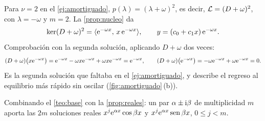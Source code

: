 \begin{ejemplo}\label{ej:critico}
Para $\nu=2$ en el \cref{ej:amortiguado}, $p(\lambda)=(\lambda+\omega)^{2}$, es
decir, $\mathcal{L}=(D+\omega)^{2}$, con $\lambda=-\omega$ y $m=2$. La
\cref{prop:nucleo} da
\begin{equation}\label{eq:critico}
  \operatorname{ker}(D+\omega)^{2}=\langle \mathrm{e}^{-\omega x},\,x\,\mathrm{e}^{-\omega x}\rangle,
  \qquad y=(c_0+c_1x)\,\mathrm{e}^{-\omega x}.
\end{equation}
Comprobación con la segunda solución, aplicando $D+\omega$ dos veces:
\[
  (D+\omega)\bigl(x\mathrm{e}^{-\omega x}\bigr)=\mathrm{e}^{-\omega x}-\omega x\mathrm{e}^{-\omega x}+\omega x\mathrm{e}^{-\omega x}=\mathrm{e}^{-\omega x},
  \qquad
  (D+\omega)\bigl(\mathrm{e}^{-\omega x}\bigr)=-\omega\mathrm{e}^{-\omega x}+\omega\mathrm{e}^{-\omega x}=0 .
\]
Es la segunda solución que faltaba en el \cref{ej:amortiguado}, y describe el
regreso al equilibrio más rápido sin oscilar (\cref{fig:amortiguado}\,(b)).
\end{ejemplo}

\begin{observacion}\label{obs:complejas-multiples}
Combinando el \cref{teo:base} con la \cref{prop:reales}: un par
$\alpha\pm\mathrm{i}\beta$ de multiplicidad $m$ aporta las $2m$ soluciones reales
$x^{j}\mathrm{e}^{\alpha x}\cos\beta x$ y $x^{j}\mathrm{e}^{\alpha x}\operatorname{sen}\beta x$,
$0\le j<m$.
\end{observacion}
